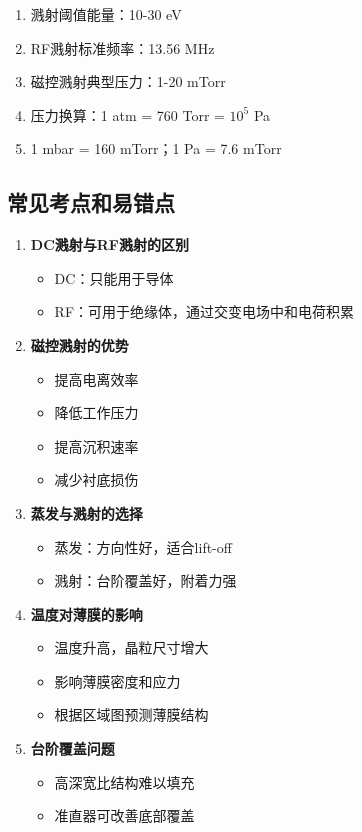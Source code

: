 \documentclass[UTF8,12pt,a4paper]{ctexart}
\begin{document}
\begin{enumerate}
    \item 溅射阈值能量：10-30 eV
    \item RF溅射标准频率：13.56 MHz
    \item 磁控溅射典型压力：1-20 mTorr
    \item 压力换算：1 atm = 760 Torr = $10^5$ Pa
    \item 1 mbar = 160 mTorr；1 Pa = 7.6 mTorr
\end{enumerate}

\subsection{常见考点和易错点}

\begin{enumerate}
    \item \textbf{DC溅射与RF溅射的区别}
    \begin{itemize}
        \item DC：只能用于导体
        \item RF：可用于绝缘体，通过交变电场中和电荷积累
    \end{itemize}
    
    \item \textbf{磁控溅射的优势}
    \begin{itemize}
        \item 提高电离效率
        \item 降低工作压力
        \item 提高沉积速率
        \item 减少衬底损伤
    \end{itemize}
    
    \item \textbf{蒸发与溅射的选择}
    \begin{itemize}
        \item 蒸发：方向性好，适合lift-off
        \item 溅射：台阶覆盖好，附着力强
    \end{itemize}
    
    \item \textbf{温度对薄膜的影响}
    \begin{itemize}
        \item 温度升高，晶粒尺寸增大
        \item 影响薄膜密度和应力
        \item 根据区域图预测薄膜结构
    \end{itemize}
    
    \item \textbf{台阶覆盖问题}
    \begin{itemize}
        \item 高深宽比结构难以填充
        \item 准直器可改善底部覆盖
    \end{itemize}
\end{enumerate}
\end{document}
